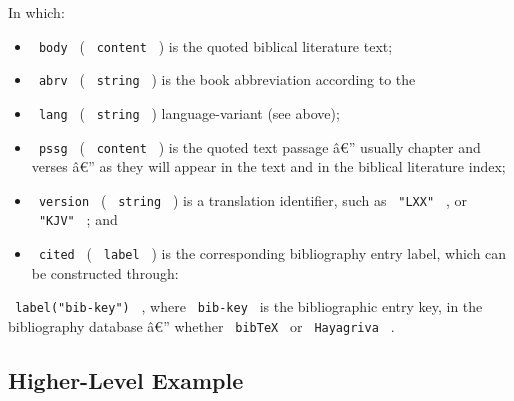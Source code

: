 In which:

\begin{itemize}
\tightlist
\item
  \texttt{\ body\ } ( \texttt{\ content\ } ) is the quoted biblical
  literature text;
\item
  \texttt{\ abrv\ } ( \texttt{\ string\ } ) is the book abbreviation
  according to the
\item
  \texttt{\ lang\ } ( \texttt{\ string\ } ) language-variant (see
  above);
\item
  \texttt{\ pssg\ } ( \texttt{\ content\ } ) is the quoted text passage
  â€'' usually chapter and verses â€'' as they will appear in the text
  and in the biblical literature index;
\item
  \texttt{\ version\ } ( \texttt{\ string\ } ) is a translation
  identifier, such as \texttt{\ "LXX"\ } , or \texttt{\ "KJV"\ } ; and
\item
  \texttt{\ cited\ } ( \texttt{\ label\ } ) is the corresponding
  bibliography entry label, which can be constructed through:
\end{itemize}

\texttt{\ label("bib-key")\ } , where \texttt{\ bib-key\ } is the
bibliographic entry key, in the bibliography database â€'' whether
\texttt{\ bibTeX\ } or \texttt{\ Hayagriva\ } .

\subsection{Higher-Level Example}\label{higher-level-example}

\begin{Shaded}
\begin{Highlighting}[]








\end{Highlighting}
\end{Shaded}


